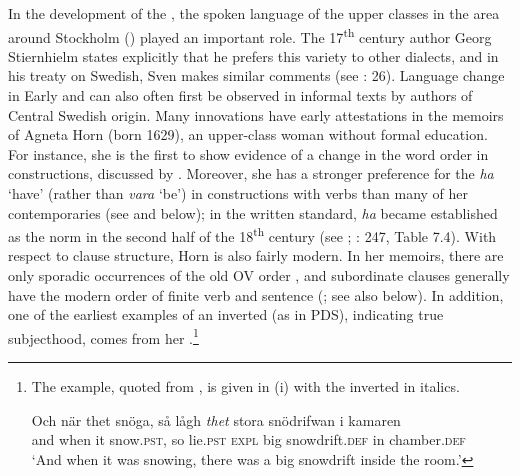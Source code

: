 \documentclass[output=paper]{langscibook}
\begin{document}
In the development of the , the spoken language of the upper classes in the area around Stockholm () played an important role. The 17\textsuperscript{th} century author Georg Stiernhielm states explicitly that he prefers this variety to other dialects, and in his treaty on Swedish, Sven \citet{Hof1753} makes similar comments (see \citealt{Widmark2000}: 26). Language change in Early and  can also often first be observed in informal texts by authors of Central Swedish origin. Many innovations have early attestations in the memoirs of Agneta Horn (born 1629), an upper-class woman without formal education. For instance, she is the first to show evidence of a change in the word order in  constructions, discussed by . Moreover, she has a stronger preference for the  \textit{ha} ‘have’ (rather than \textit{vara} ‘be’) in  constructions with  verbs than many of her contemporaries (see \citealt{Larsson2009} and below); in the written standard, \textit{ha} became established as the norm in the second half of the 18\textsuperscript{th} century (see \citealt{Johannisson1945}; \citealt{Larsson2009}: 247, Table 7.4). With respect to clause structure, Horn is also fairly modern. In her memoirs, there are only sporadic occurrences of the old OV order \citep{Petzell2011}, and subordinate clauses generally have the modern order of finite verb and sentence  (\citealt{Falk1993}; see also  below). In addition, one of the earliest examples of an inverted  (as in PDS), indicating true subjecthood, comes from her \citep[268]{Falk1993}.\footnote{The example, quoted from \citet[268]{Falk1993}, is given in (i) with the inverted  in italics.

\ea\gll Och  när    thet  snöga,    så  lågh \textit{thet} stora  snödrifwan    i    kamaren\\
        and  when  it      snow.\textsc{pst},  so  lie.\textsc{pst}  \textsc{expl}  big    snowdrift.\textsc{def} in  chamber.\textsc{def}\\
   \glt ‘And when it was snowing, there was a big snowdrift inside the room.’
   \z}
\end{document}
